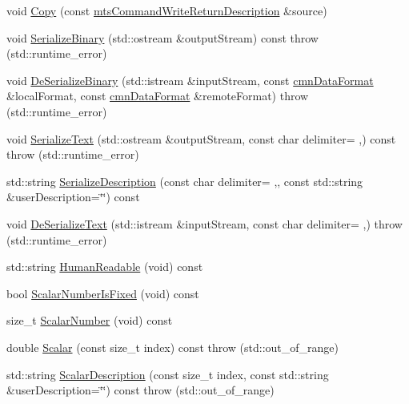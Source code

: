 \begin{DoxyCompactItemize}
\item 
void \hyperlink{classmts_command_write_return_description_ac843d60042514ae3e232c5b6d3214e18}{Copy} (const \hyperlink{classmts_command_write_return_description}{mts\+Command\+Write\+Return\+Description} \&source)
\item 
void \hyperlink{classmts_command_write_return_description_a0325349aa3f02f9bf3592ad76be72186}{Serialize\+Binary} (std\+::ostream \&output\+Stream) const   throw (std\+::runtime\+\_\+error)
\item 
void \hyperlink{classmts_command_write_return_description_af24b18353236f996c6977a65a8739513}{De\+Serialize\+Binary} (std\+::istream \&input\+Stream, const \hyperlink{classcmn_data_format}{cmn\+Data\+Format} \&local\+Format, const \hyperlink{classcmn_data_format}{cmn\+Data\+Format} \&remote\+Format)  throw (std\+::runtime\+\_\+error)
\item 
void \hyperlink{classmts_command_write_return_description_a12e8a5e1313ec3f4203d211b9c3eca5a}{Serialize\+Text} (std\+::ostream \&output\+Stream, const char delimiter= \textquotesingle{},\textquotesingle{}) const   throw (std\+::runtime\+\_\+error)
\item 
std\+::string \hyperlink{classmts_command_write_return_description_a96a855e68e08197a1f932f7af1af40c6}{Serialize\+Description} (const char delimiter= \textquotesingle{},\textquotesingle{}, const std\+::string \&user\+Description=\char`\"{}\char`\"{}) const 
\item 
void \hyperlink{classmts_command_write_return_description_ad19f858bf83e99218240a0b92e021504}{De\+Serialize\+Text} (std\+::istream \&input\+Stream, const char delimiter= \textquotesingle{},\textquotesingle{})  throw (std\+::runtime\+\_\+error)
\item 
std\+::string \hyperlink{classmts_command_write_return_description_a06eb61699b970435123a66cbd919698e}{Human\+Readable} (void) const 
\item 
bool \hyperlink{classmts_command_write_return_description_a1fe3785c2eb535bc63e9078454b434a4}{Scalar\+Number\+Is\+Fixed} (void) const 
\item 
size\+\_\+t \hyperlink{classmts_command_write_return_description_aee859e14f5b248e7a309448d645a0124}{Scalar\+Number} (void) const 
\item 
double \hyperlink{classmts_command_write_return_description_aec41d51c390e02262186155e2a2d3feb}{Scalar} (const size\+\_\+t index) const   throw (std\+::out\+\_\+of\+\_\+range)
\item 
std\+::string \hyperlink{classmts_command_write_return_description_ab83991d601f3595992ab455b98bd29b0}{Scalar\+Description} (const size\+\_\+t index, const std\+::string \&user\+Description=\char`\"{}\char`\"{}) const   throw (std\+::out\+\_\+of\+\_\+range)
\end{DoxyCompactItemize}

